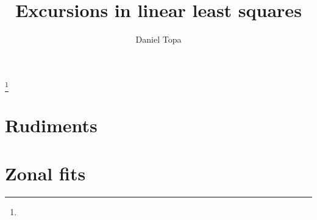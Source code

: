\documentclass{amsbook}
\newcommand{\pathchapter}  {../chapters/}
\begin{document}
\frontmatter

\title{Excursions in linear least squares}


\author{Daniel Topa}
\address{}
\curraddr{}
\thanks{}



\date{}

\begin{abstract}
\end{abstract}

\maketitle


\setcounter{page}{5}

\tableofcontents



\mainmatter

\part{\label{part:first}Rudiments}  %
%  



\part{\label{part:zonal}Zonal fits}  %

%
\end{document}
